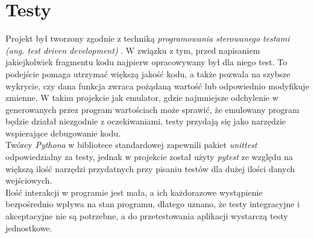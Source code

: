 \section{Testy}
Projekt był tworzony zgodnie z techniką \textit{programowania sterowanego testami (ang. \textit{test driven development})} \cite{WOZNIAK}. W związku z tym, przed napisaniem jakiejkolwiek fragmentu kodu najpierw opracowywany był dla niego test. To podejście pomaga utrzymać większą jakość kodu, a także pozwala na szybsze wykrycie, czy dana funkcja zwraca pożądaną wartość lub odpowiednio modyfikuje zmienne. W takim projekcie jak emulator, gdzie najmniejsze odchylenie w generowanych przez program wartościach może sprawić, że emulowany program będzie działał niezgodnie z oczekiwaniami, testy przydają się jako narzędzie wspierające debugowanie kodu.\\

Twórcy \textit{Pythona} w bibliotece standardowej zapewnili pakiet \textit{unittest} odpowiedzialny za testy, jednak w projekcie został użyty \textit{pytest} ze względu na większą ilość narzędzi przydatnych przy pisaniu testów dla dużej ilości danych wejściowych.\\

Ilość interakcji w programie jest mała, a ich każdorazowe wystąpienie bezpośrednio wpływa na stan programu, dlatego uznano, że testy integracyjne i akceptacyjne \cite{WOZNIAK} nie są potrzebne, a do przetestowania aplikacji wystarczą testy jednostkowe.\\

